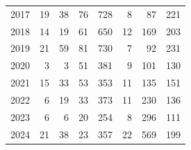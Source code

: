 \documentclass[
  english,
]{article}
\begin{document}
\begin{longtable}{rrrrrrrr}
2017 & 19 & 38 & 76 & 728 & 8 & 87 & 221 \\ 
2018 & 14 & 19 & 61 & 650 & 12 & 169 & 203 \\ 
2019 & 21 & 59 & 81 & 730 & 7 & 92 & 231 \\ 
2020 & 3 & 3 & 51 & 381 & 9 & 101 & 130 \\ 
2021 & 15 & 33 & 53 & 353 & 11 & 135 & 151 \\ 
2022 & 6 & 19 & 33 & 373 & 11 & 230 & 136 \\ 
2023 & 6 & 6 & 20 & 254 & 8 & 296 & 111 \\ 
2024 & 21 & 38 & 23 & 357 & 22 & 569 & 199 \\ 
\bottomrule

\end{longtable}

\endgroup

\newpage{}

\begingroup
\fontsize{9.0pt}{11.0pt}\selectfont
\end{document}
